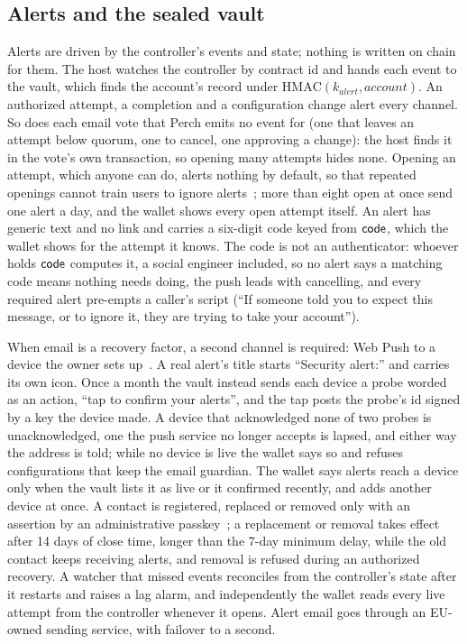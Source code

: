 \subsection{Alerts and the sealed vault}\label{sec:design-alerts}
Alerts are driven by the controller's events and state; nothing is written
on chain for them. The host watches the controller by contract id and hands
each event to the vault, which finds the account's record under
$\mathrm{HMAC}(k_\mathit{alert}, \mathit{account})$. An authorized attempt, a
completion and a configuration change alert every channel. So does each
email vote that Perch emits no event for (one that leaves an attempt below
quorum, one to cancel, one approving a change): the host finds it in the
vote's own transaction, so opening many attempts hides none. Opening an
attempt, which anyone can do, alerts nothing by default, so that repeated
openings cannot train users to ignore alerts~\cite{anderson-habituation};
more than eight open at once send one alert a day, and the wallet shows
every open attempt itself. An alert has generic text and no link and carries
a six-digit code keyed from $\mathsf{code}$, which the wallet shows for the attempt
it knows. The code is not an authenticator: whoever holds
$\mathsf{code}$ computes it, a social engineer included, so no alert says a matching
code means nothing needs doing, the push leads with cancelling, and every
required alert pre-empts a caller's script (``If someone told you to expect
this message, or to ignore it, they are trying to take your
account'').

When email is a recovery factor, a second channel is required: Web Push to a
device the owner sets up~\cite{rfc8030,rfc8291,rfc8292}. A real alert's
title starts ``Security alert:'' and carries its own icon. Once a month the
vault instead sends each device a probe worded as an action, ``tap to
confirm your alerts'', and the tap posts the probe's id signed by a key the
device made. A device that acknowledged none of two probes is
unacknowledged, one the push service no longer accepts is lapsed, and either
way the address is told; while no device is live the wallet says so and
refuses configurations that keep the email guardian. The wallet says alerts
reach a device only when the vault lists it as live or it confirmed
recently, and adds another device at once.
A contact is registered, replaced or removed only with an assertion by an
administrative passkey~\cite{webauthn3}; a replacement or removal takes
effect after 14 days of close time, longer than the 7-day minimum delay,
while the old contact keeps receiving alerts, and removal is refused during
an authorized recovery. A watcher that missed
events reconciles from the controller's state after it restarts and raises a
lag alarm, and independently the wallet reads every live attempt from the
controller whenever it opens.
Alert email goes through an EU-owned sending service, with failover to a
second.


